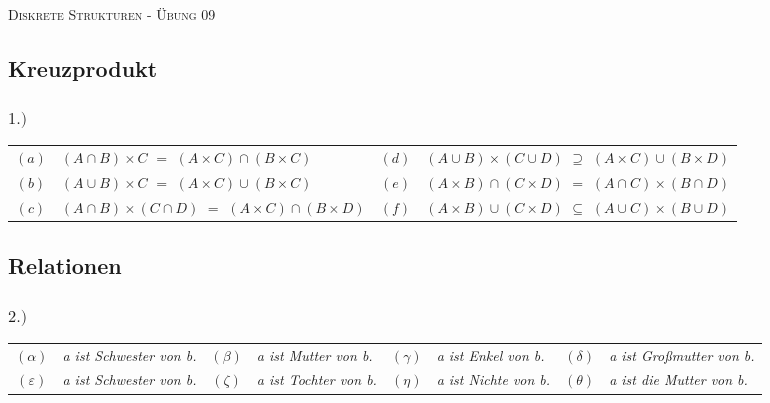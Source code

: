 \documentclass[titlepage]{article}
\newcommand{\1}{\mathbb{1}}
\newcommand{\0}{\mathbb{0}}
\begin{document}
	
	\begin{center}
		\hrulefill\\
		\begin{center}
			\LARGE\textsc{Diskrete Strukturen - Übung 09} \normalsize\\
		\end{center}
		\hrulefill
		\date{\today}
	\end{center}

	\subsection*{Kreuzprodukt}
		\subsubsection*{$1.)$}
			\begin{table}[h]
				\begin{tabular}{clcl}
					$(a)$&$(A\cap B)\times C$ $=$ $(A\times C)\cap(B\times C)$&
					$(d)$&$(A\cup B)\times(C\cup D)$ $\supseteq$ $(A\times C)\cup(B\times D)$\\
					$(b)$&$(A\cup B)\times C$ $=$ $(A\times C)\cup(B\times C)$&
					$(e)$&$(A\times B)\cap(C\times D)$ $=$ $(A\cap C)\times(B\cap D)$\\
					$(c)$&$(A\cap B)\times(C\cap D)$ $=$ $(A\times C)\cap(B\times D)$&
					$(f)$&$(A\times B)\cup(C\times D)$ $\subseteq$ $(A\cup C)\times(B\cup D)$
				\end{tabular}
			\end{table}
		
	\subsection*{Relationen}
		\subsubsection*{$2.)$}
			\begin{table}[h]
				\begin{tabular}{clclclcl}
					$(\alpha)$&\textit{a ist Schwester von b.}&
					$(\beta)$&\textit{a ist Mutter von b.}&
					$(\gamma)$&\textit{a ist Enkel von b.}&
					$(\delta)$&\textit{a ist Großmutter von b.}\\
					$(\varepsilon)$&\textit{a ist Schwester von b.}&%
					$(\zeta)$&\textit{a ist Tochter von b.}&%
					$(\eta)$&\textit{a ist Nichte von b.}&
					$(\theta)$&\textit{a ist die Mutter von b.}%
				\end{tabular}
			\end{table}
		
\end{document}
